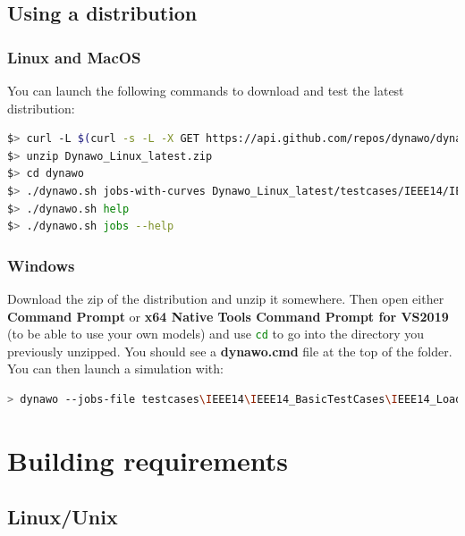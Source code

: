 \documentclass[a4paper, 12pt]{report}
\begin{document}
\subsection{Using a distribution}

\subsubsection{Linux and MacOS}

You can launch the following commands to download and test the latest distribution:

\begin{lstlisting}[language=bash, breaklines=true, breakatwhitespace=false]
$> curl -L $(curl -s -L -X GET https://api.github.com/repos/dynawo/dynawo/releases/latest | grep "Dynawo_Linux" | grep url | cut -d '"' -f 4) -o Dynawo_Linux_latest.zip
$> unzip Dynawo_Linux_latest.zip
$> cd dynawo
$> ./dynawo.sh jobs-with-curves Dynawo_Linux_latest/testcases/IEEE14/IEEE14_SyntaxExamples/IEEE14_ModelicaModel/IEEE14.jobs
$> ./dynawo.sh help
$> ./dynawo.sh jobs --help
\end{lstlisting}

\subsubsection{Windows}

Download the zip of the distribution and unzip it somewhere. Then open either \textbf{Command Prompt} or \textbf{x64 Native Tools Command Prompt for VS2019} (to be able to use your own models) and use \lstinline[language=bash]{cd} to go into the directory you previously unzipped. You should see a \textbf{dynawo.cmd} file at the top of the folder. You can then launch a simulation with:

\begin{lstlisting}[language=bash, breaklines=true, breakatwhitespace=false]
> dynawo --jobs-file testcases\IEEE14\IEEE14_BasicTestCases\IEEE14_LoadVariation\IEEE14.jobs
\end{lstlisting}

\section{Building requirements}

\subsection{Linux/Unix}
\end{document}
